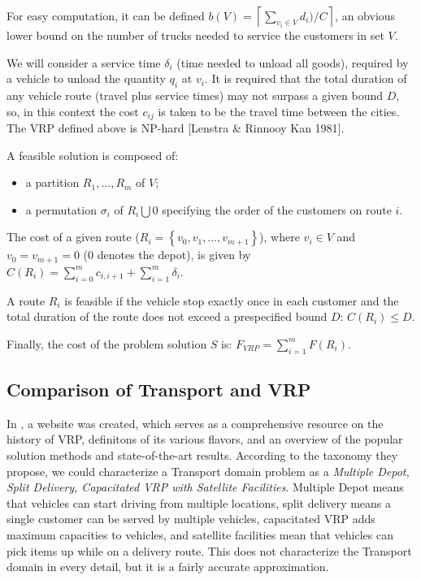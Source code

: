 {For easy computation, it can be defined ${b(V) = \left\lceil \sum_{v_{i} \in V} d_{i}) / C \right\rceil}$, an obvious lower bound on the number of trucks needed to service the customers in set ${V}$.

We will consider a service time $\delta_{i}$ (time needed to unload all goods), required by a vehicle to unload the quantity ${q_{i}}$ at ${v_{i}}$. It is required that the total duration of any vehicle route (travel plus service times) may not surpass a given bound ${D}$, so, in this context the cost ${c_{ij}}$ is taken to be the travel time between the cities. The VRP defined above is NP-hard [Lenstra \& Rinnooy Kan 1981].

A feasible solution is composed of:

\begin{itemize}
\item a partition ${R_{1}, \ldots, R_{m}}$ of ${V}$;
\item a permutation ${\sigma_{i}}$ of ${R_{i} \bigcup {0}}$ specifying the order of the customers on route ${i}$.
\end{itemize}


The cost of a given route (${R_{i} = \left\lbrace v_{0}, v_{1}, \ldots, v_{m+1} \right\rbrace}$), where ${v_{i} \in V}$ and ${v_{0} = v_{m+1} = 0}$ (0 denotes the depot), is given by ${C(R_{i}) = \sum_{i=0}^{m} c_{i,i+1} + \sum_{i=1}^{m} \delta_{i}}$.

A route ${R_{i}}$ is feasible if the vehicle stop exactly once in each customer and the total duration of the route does not exceed a prespecified bound ${D}$: ${C(R_{i}) \leq D}$.

Finally, the cost of the problem solution ${S}$ is: ${F_{VRP} = \sum_{i=1}^{m} F(R_{i})}$.
}

\subsection{Comparison of Transport and VRP}

In \citet{ResearchGroup2013}, a website was created, which serves as a comprehensive resource on the history of VRP,
definitons of its various flavors, and an overview of the popular solution methods and state-of-the-art results. According to the taxonomy they propose, we could characterize a Transport domain problem
as a \textit{Multiple Depot, Split Delivery, Capacitated VRP with Satellite Facilities}. Multiple Depot
means that vehicles can start driving from multiple locations, split delivery
means a single customer can be served by multiple vehicles, capacitated VRP adds maximum
capacities to vehicles, and satellite facilities mean that vehicles can pick items up
while on a delivery route. This does not characterize the Transport domain in every detail, but it is a fairly accurate approximation.

